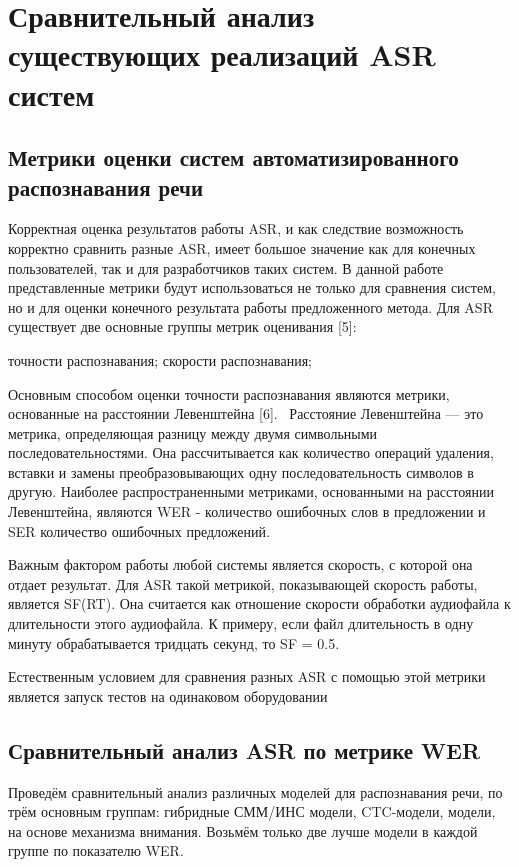 \documentclass[conference]{IEEEtran}
\begin{document}
    \section{Сравнительный анализ существующих реализаций ASR систем}

    \subsection{Метрики оценки систем автоматизированного распознавания речи}\label{AA}

    Корректная оценка результатов работы ASR, и как следствие возможность корректно сравнить разные ASR, имеет большое значение как для конечных пользователей, так и для разработчиков таких систем. В данной работе представленные метрики будут использоваться не только для сравнения систем, но и для оценки конечного результата работы предложенного метода.
    Для ASR существует две основные группы метрик оценивания [5]:
    \begin{itemize}
         точности распознавания;
         скорости распознавания;
    \end{itemize}

    Основным способом оценки точности распознавания являются метрики, основанные на расстоянии Левенштейна [6]. 
Расстояние Левенштейна — это метрика, определяющая разницу между двумя символьными последовательностями. Она рассчитывается как количество операций удаления, вставки и замены преобразовывающих одну последовательность символов в другую. Наиболее распространенными метриками, основанными на расстоянии Левенштейна, являются WER - количество ошибочных слов в предложении и SER количество ошибочных предложений.

Важным фактором работы любой системы является скорость, с которой она отдает результат. Для ASR такой метрикой, показывающей скорость работы, является SF(RT). Она считается как отношение скорости обработки аудиофайла к длительности этого аудиофайла. К примеру, если файл длительность в одну минуту обрабатывается тридцать секунд, то SF = 0.5.

Естественным условием для сравнения разных ASR с помощью этой метрики является запуск тестов на одинаковом оборудовании

\subsection{Сравнительный анализ ASR по метрике WER}\label{AA}
Проведём сравнительный анализ различных моделей для распознавания речи, по трём основным группам: гибридные СММ/ИНС модели, CTC-модели, модели, на основе механизма внимания. Возьмём только две лучше модели в каждой группе по показателю WER.
\end{document}
